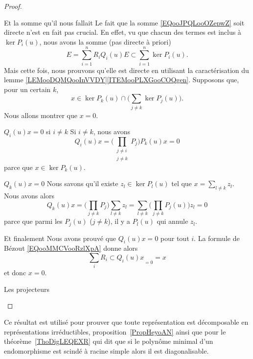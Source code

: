\begin{proof}
\begin{subproof}
\item[Et la somme qu'il nous fallait]
    Le fait que la somme \eqref{EQooJPQLooOZepwZ} soit directe n'est en fait pas crucial. En effet, vu que chacun des termes est inclus à \( \ker P_i(u)\), nous avons la somme (pas directe à priori)
    \begin{equation}
        E=\sum_{i=1}^nR_iQ_i(u)E\subset\sum_{i=1}^n\ker P_i(u).
    \end{equation}
    Mais cette fois, nous prouvons qu'elle est directe en utilisant la caractérisation du lemme \ref{LEMooDQMQooInVVDY}\ref{ITEMooPLXGooCOQgen}. Supposons que, pour un certain \( k\),
    \begin{equation}
        x\in\ker P_k(u)\cap\big( \sum_{j\neq k}\ker P_j(u) \big).
    \end{equation}
    Nous allons montrer que \( x=0\).
    \begin{subproof}
    \item[\( Q_i(u)x=0\) si \( i\neq k\)]
        Si \( i\neq k\), nous avons
        \begin{equation}
            Q_i(u)x=\Big( \prod_{\substack{j\neq i\\j\neq k}}P_j \Big)P_k(u)x=0
        \end{equation}
        parce que \( x\in\ker P_k(u)\).
    \item[\( Q_k(u)x=0\)]
        Nous savons qu'il existe \( z_l\in\ker P_l(u)\) tel que \( x=\sum_{l\neq k}z_l\). Nous avons alors
        \begin{equation}
            Q_k(u)x=\Big( \prod_{j\neq k}P_j \Big)\sum_{l\neq k}z_l=\sum_{l\neq k}\Big( \prod_{j\neq k}P_j(u) \Big)z_l=0
        \end{equation}
        parce que parmi les \( P_j(u)\) (\( j\neq k\)), il y a \( P_l(u)\) qui annule \( z_l\).
    \item[Et finalement]
        Nous avons prouvé que \( Q_i(u)x=0\) pour tout \( i\). La formule de Bézout \eqref{EQooMMCVooRzlXpA} donne alors
        \begin{equation}
            \sum_iR_i\subset{Q_i(u)x}_{=0}=x
        \end{equation}
        et donc \( x=0\).
    \end{subproof}
\item[Les projecteurs]
    \end{subproof}
\end{proof}

\begin{normaltext}
    Ce résultat est utilisé pour prouver que toute représentation est décomposable en représentations irréductibles, proposition~\ref{PropHeyoAN} ainsi que pour le théorème~\ref{ThoDigLEQEXR} qui dit que si le polynôme minimal d'un endomorphisme est scindé à racine simple alors il est diagonalisable.
\end{normaltext}

